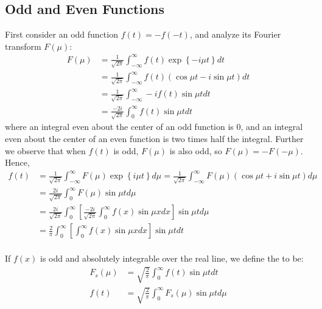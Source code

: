 \documentclass[12pt, a4paper, oneside, openright, titlepage]{book}
\begin{document}
\subsection{Odd and Even Functions}

First consider an odd function $f(t) = -f(-t)$, and analyze its Fourier transform $F(\mu)$: \begin{align*}
    F(\mu) &= \frac{1}{\sqrt{2\pi}}\int_{-\infty}^{\infty}f(t)\exp\left\{-i\mu t\right\}dt \\
    &=\frac{1}{\sqrt{2\pi}}\int_{-\infty}^{\infty}f(t)(\cos\mu t - i\sin\mu t)dt \\
    &= \frac{1}{\sqrt{2\pi}}\int_{-\infty}^{\infty}-if(t)\sin\mu tdt \\
    &= \frac{-2i}{\sqrt{2\pi}}\int_0^{\infty}f(t)\sin\mu tdt
\end{align*}
where an integral even about the center of an odd function is $0$, and an integral even about the center of an even function is two times half the integral. Further we observe that when $f(t)$ is odd, $F(\mu)$ is also odd, so $F(\mu) = -F(-\mu)$. Hence, \begin{align*}
    f(t) &= \frac{1}{\sqrt{2\pi}}\int_{-\infty}^{\infty}F(\mu)\exp\left\{i\mu t\right\}d\mu = \frac{1}{\sqrt{2\pi}}\int_{-\infty}^{\infty}F(\mu)(\cos \mu t+i\sin\mu t)d\mu \\
    &= \frac{2i}{\sqrt{2\pi}}\int_0^{\infty}F(\mu)\sin\mu td\mu \\
    &= \frac{2i}{\sqrt{2\pi}}\int_0^{\infty}\left[\frac{-2i}{\sqrt{2\pi}}\int_0^{\infty}f(x)\sin\mu xdx\right]\sin\mu td\mu \\
    &= \frac{2}{\pi}\int_0^{\infty}\left[\int_0^{\infty}f(x)\sin\mu xdx\right]\sin\mu tdt \\
\end{align*}

\begin{defn}
    If $f(x)$ is odd and absolutely integrable over the real line, we define the  to be: \begin{align}
        F_s(\mu) &= \sqrt{\frac{2}{\pi}}\int_0^{\infty}f(t)\sin\mu tdt \\
        f(t) &= \sqrt{\frac{2}{\pi}}\int_0^{\infty}F_s(\mu)\sin\mu td\mu
    \end{align}
\end{defn}
\end{document}

